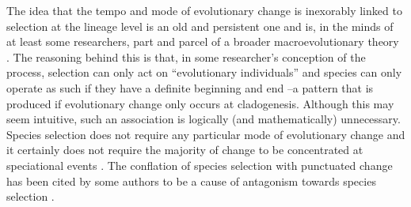 The idea that the tempo and mode of evolutionary change is inexorably linked to selection at the lineage level is an old and persistent one and is, in the minds of at least some researchers, part and parcel of a broader macroevolutionary theory \citep{Stanley1975, Stanley1979, GouldEldredge1977, Gould1980, Charlesworth1982, Dennett1995, Levinton2001, Gould2002}. The reasoning behind this is that, in some researcher's conception of the process, selection can only act on ``evolutionary individuals'' \citep{Hull1980} and species can only operate as such if they have a definite beginning and end \citep{GouldEldredge1977, Gould2002}--a pattern that is produced if evolutionary change only occurs at cladogenesis. Although this may seem intuitive, such an association is logically (and mathematically) unnecessary. Species selection does not require any particular mode of evolutionary change and it certainly does not require the majority of change to be concentrated at speciational events \citep{VanValen1975, Bookstein1978, Slatkin1981, ArnoldFristrup1982, Rice1995, McShea2004, Rice2004, Okasha2006, Simpson2013} \citep[see discussion in ][pp. 513-514]{Jablonski2008}. The conflation of species selection with punctuated change has been cited by some authors to be a cause of antagonism towards species selection \citep{Turner2010, FitzJohnthesis}.

